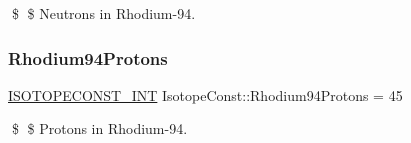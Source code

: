 \$ \$ Neutrons in Rhodium-\/94. \mbox{\label{group___isotope_const-_rhodium-_rh94_ga7ea6a005aa472f1b49c825ddba1c714f}} 
\subsubsection{\texorpdfstring{Rhodium94\+Protons}{Rhodium94Protons}}
{\footnotesize\ttfamily \mbox{\hyperlink{group___isotope_const-_macros_ga5f18360b3e99483a35c32d789e62621c}{I\+S\+O\+T\+O\+P\+E\+C\+O\+N\+S\+T\+\_\+\+I\+NT}} Isotope\+Const\+::\+Rhodium94\+Protons = 45}

\$ \$ Protons in Rhodium-\/94. 